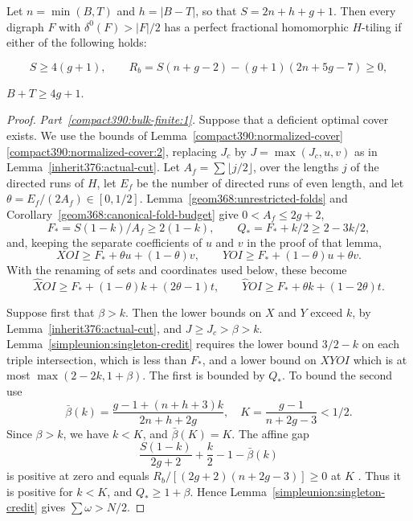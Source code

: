 \begin{theorem}
\label{compact390:bulk-finite}\label{compact390:outer-finite}
Let $n=\min(B,T)$ and $h=|B-T|$, so that $S=2n+h+g+1$. Then every digraph $F$ with $\delta^0(F)>|F|/2$ has a perfect fractional homomorphic $H$-tiling
if either of the following holds:
\begin{props}
\item\label{compact390:bulk-finite:1} \[
 S\ge4(g+1),\qquad
 R_b=S(n+g-2)-(g+1)(2n+5g-7)\ge0,
\]
\item\label{compact390:bulk-finite:2} $B+T\ge4g+1$.
\end{props}
\end{theorem}
\begin{proof}
\emph{Part~\ref{compact390:bulk-finite:1}.} Suppose that a deficient optimal cover exists. We use the bounds of
Lemma~\ref{compact390:normalized-cover}\ref{compact390:normalized-cover:2}, replacing $J_c$ by
$J=\max(J_c,u,v)$ as in Lemma~\ref{inherit376:actual-cut}.
Let $A_f=\sum\lfloor j/2\rfloor$, over the lengths $j$ of the directed runs of $H$, let $E_f$ be the number
of directed runs of even length, and let $\theta=E_f/(2A_f)\in[0,1/2]$.
Lemma~\ref{geom368:unrestricted-folds} and
Corollary~\ref{geom368:canonical-fold-budget} give $0<A_f\le2g+2$,
\[
 F_*=S(1-k)/A_f\ge2(1-k),\qquad Q_*=F_*+k/2\ge2-3k/2,
\]
and, keeping the separate coefficients of $u$ and $v$ in the proof of that lemma,
\[
 XOI\ge F_*+\theta u+(1-\theta)v,\qquad
 YOI\ge F_*+(1-\theta)u+\theta v.
\]
With the renaming of sets and coordinates used below, these become
\[
 \widehat XOI\ge F_*+(1-\theta)k+(2\theta-1)t,\qquad
 \widehat YOI\ge F_*+\theta k+(1-2\theta)t.
\]

Suppose first that $\beta>k$. Then the lower bounds on $X$ and $Y$ exceed $k$, by Lemma~\ref{inherit376:actual-cut}, and
$J\ge J_c>\beta>k$. Lemma~\ref{simpleunion:singleton-credit}
requires the lower bound $3/2-k$ on each triple intersection, which is less than $F_*$,
and a lower bound on $XYOI$ which is at most
$\max(2-2k,1+\beta)$. The first is bounded by $Q_*$. To bound the second use
\[
 \bar\beta(k)=\frac{g-1+(n+h+3)k}{2n+h+2g},\quad
 K=\frac{g-1}{n+2g-3}<1/2.
\]
Since $\beta>k$, we have $k<K$, and $\bar\beta(K)=K$.
The affine gap
\[
 \frac{S(1-k)}{2g+2}+\frac{k}{2}-1-\bar\beta(k)
\]
is positive at zero and equals $R_b/[(2g+2)(n+2g-3)]\ge0$ at $K$ .
Thus it is positive for $k<K$, and $Q_*\ge1+\beta$.
Hence Lemma~\ref{simpleunion:singleton-credit} gives
$\sum\omega>N/2$.


\end{proof}
